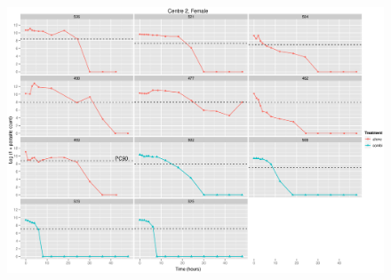 \begin{singlespace}
\begin{figure}
\end{figure}
\begin{figure}
\includegraphics[height=150mm]{Araw2F.eps}
\end{figure}

\clearpage

\end{singlespace}
